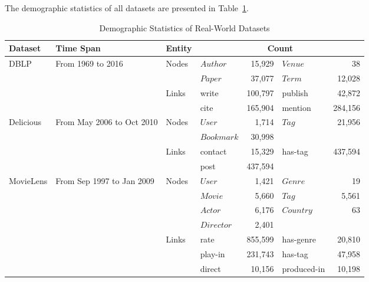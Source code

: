 The demographic statistics of all datasets are presented in Table~\ref{table:dataset}.


\begin{table}[t]
    \centering
    \caption{Demographic Statistics of Real-World Datasets}
    \label{table:dataset}
    \footnotesize
    \begin{tabular} {l l l l r l r}
        \toprule
        Dataset & Time Span & Entity & \multicolumn{4}{c}{Count}\\
        \midrule %
        \multirow{4}{*}{DBLP} & \multirow{4}{*}{From 1969 to 2016}
        & \multirow{2}{*}{Nodes}
        & $Author$ & 15,929 & $Venue$ & 38 \\ %
        & & & $Paper$ & 37,077 & $Term$ & 12,028 \\ %
        \cmidrule{3-7}
        & & \multirow{2}{*}{Links}
        & write & 100,797 & publish & 42,872 \\ %
        & & & cite & 165,904 & mention & 284,156 \\ %
        
        \midrule %
        \multirow{4}{*}{Delicious} & \multirow{4}{*}{From May 2006 to Oct 2010}
        & \multirow{2}{*}{Nodes}
        & $User$ & 1,714 & $Tag$ & 21,956 \\ %
        & & & $Bookmark$ & 30,998 & & \\ %
        \cmidrule{3-7}
        & & \multirow{2}{*}{Links}
        & contact & 15,329 & has-tag & 437,594 \\ %
        & & & post & 437,594 & & \\ %
        
        \midrule %
        \multirow{7}{*}{MovieLens} & \multirow{7}{*}{From Sep 1997 to Jan 2009}
        & \multirow{4}{*}{Nodes}
        & $User$ & 1,421 & $Genre$ & 19 \\ %
        & & & $Movie$ & 5,660 & $Tag$ & 5,561 \\ %
        & & & $Actor$ & 6,176 & $Country$ & 63 \\ %
        & & & $Director$ & 2,401 & & \\ %
        \cmidrule{3-7}
        & & \multirow{3}{*}{Links}
        & rate & 855,599 & has-genre & 20,810 \\ %
        & & & play-in & 231,743 & has-tag & 47,958 \\ %
        & & & direct & 10,156 & produced-in & 10,198 \\ %
        \bottomrule %
    \end{tabular}
\end{table}

